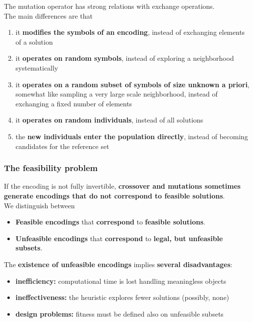 The mutation operator has strong relations with exchange operations.\\
The main differences are that
\begin{enumerate}
	\item it \textbf{modifies the symbols of an encoding}, instead of exchanging elements of a solution
	\item it \textbf{operates on random symbols}, instead of exploring a neighborhood systematically
	\item it \textbf{operates on a random subset of symbols of size unknown a priori}, somewhat like sampling a very large scale neighborhood, instead of exchanging a fixed number of elements
	\item it \textbf{operates on random individuals}, instead of all solutions
	\item the \textbf{new individuals enter the population directly}, instead of becoming candidates for the reference set
\end{enumerate}

\newpage

\subsubsection{The feasibility problem}
If the encoding is not fully invertible, \textbf{crossover and mutations sometimes generate encodings that do not correspond to feasible solutions}.\\

We distinguish between
\begin{itemize}
	\item \textbf{Feasible encodings} that \textbf{correspond} to \textbf{feasible solutions}.\\
	
	\item \textbf{Unfeasible encodings} that \textbf{correspond} to \textbf{legal, but unfeasible subsets}.\\
\end{itemize}

The \textbf{existence of unfeasible encodings} implies \textbf{several disadvantages}:
\begin{itemize}
	\item \textbf{inefficiency:} computational time is lost handling meaningless objects
	\item \textbf{ineffectiveness:} the heuristic explores fewer solutions (possibly, none)
	\item \textbf{design problems:} fitness must be defined also on unfeasible subsets
\end{itemize}
\nn

